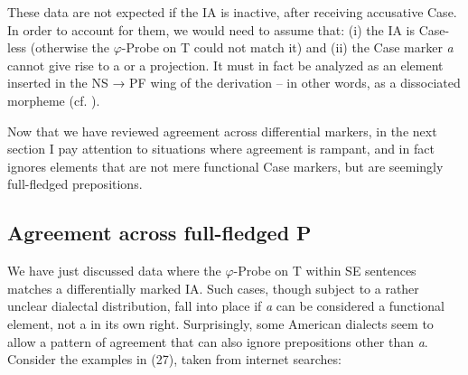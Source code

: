 \documentclass[output=paper]{langsci/langscibook}
\begin{document}
These data are not expected if the IA is inactive, after receiving accusative Case. In order to account for them, we would need to assume that: (i) the IA is Case-less (otherwise the $\varphi $-Probe on T could not match it) and (ii) the Case marker \textit{a} cannot give rise to a \CATPP or a \CATKP projection. It must in fact be analyzed as an element inserted in the NS → PF wing of the derivation – in other words, as a dissociated morpheme (cf. \citealt{Halle1993}).

  Now that we have reviewed agreement across differential markers, in the next section I pay attention to situations where agreement is rampant, and in fact ignores elements that are not mere functional Case markers, but are seemingly full-fledged prepositions.

\subsection{Agreement across full-fledged P}%

We have just discussed data where the $\varphi $-Probe on T within SE sentences matches a differentially marked IA. Such cases, though subject to a rather unclear dialectal distribution, fall into place if  \textit{a} can be considered a functional element, not a  in its own right. Surprisingly, some American  dialects seem to allow a pattern of agreement that can also ignore prepositions other than \textit{a}. Consider the examples in (27), taken from internet searches:\largerpage[2]
\end{document}
